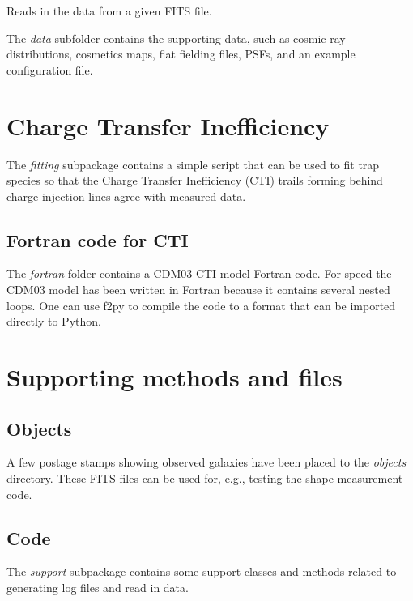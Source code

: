 \documentclass[a4paper,12pt,english]{sphinxmanual}
\begin{document}
\begin{fulllineitems}
\label{analysis:analysis.PSFproperties.readData}
Reads in the data from a given FITS file.

\end{fulllineitems}


The \emph{data} subfolder contains the supporting data, such as cosmic ray distributions, cosmetics maps,
flat fielding files, PSFs, and an example configuration file.


\chapter{Charge Transfer Inefficiency}
\label{index:charge-transfer-inefficiency}
The \emph{fitting} subpackage contains a simple script that can be used to fit trap species so that the
Charge Transfer Inefficiency (CTI) trails forming behind charge injection lines agree with measured data.


\section{Fortran code for CTI}
\label{index:fortran-code-for-cti}
The \emph{fortran} folder contains a CDM03 CTI model Fortran code. For speed the CDM03 model has been written in Fortran
because it contains several nested loops. One can use f2py to compile the code to a format that can be imported
directly to Python.


\chapter{Supporting methods and files}
\label{index:supporting-methods-and-files}

\section{Objects}
\label{index:objects}
A few postage stamps showing observed galaxies have been placed to the \emph{objects} directory. These FITS files
can be used for, e.g., testing the shape measurement code.


\section{Code}
\label{index:code}
The \emph{support} subpackage contains some support classes and methods related to generating log files and read in
data.
\end{document}

